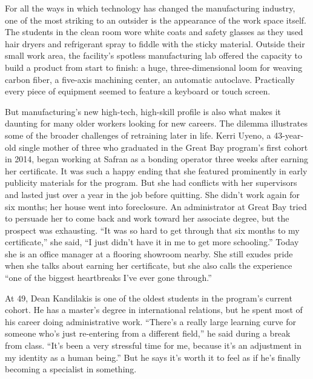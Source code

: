 For all the ways in which technology has changed the manufacturing
industry, one of the most striking to an outsider is the appearance of
the work space itself. The students in the clean room wore white coats
and safety glasses as they used hair dryers and refrigerant spray to
fiddle with the sticky material. Outside their small work area, the
facility's spotless manufacturing lab offered the capacity to build a
product from start to finish: a huge, three-dimensional loom for weaving
carbon fiber, a five-axis machining center, an automatic autoclave.
Practically every piece of equipment seemed to feature a keyboard or
touch screen.

But manufacturing's new high-tech, high-skill profile is also what makes
it daunting for many older workers looking for new careers. The dilemma
illustrates some of the broader challenges of retraining later in life.
Kerri Uyeno, a 43-year-old single mother of three who graduated in the
Great Bay program's first cohort in 2014, began working at Safran as a
bonding operator three weeks after earning her certificate. It was such
a happy ending that she featured prominently in early publicity
materials for the program. But she had conflicts with her supervisors
and lasted just over a year in the job before quitting. She didn't work
again for six months; her house went into foreclosure. An administrator
at Great Bay tried to persuade her to come back and work toward her
associate degree, but the prospect was exhausting. ``It was so hard to
get through that six months to my certificate,'' she said, ``I just
didn't have it in me to get more schooling.'' Today she is an office
manager at a flooring showroom nearby. She still exudes pride when she
talks about earning her certificate, but she also calls the experience
``one of the biggest heartbreaks I've ever gone through.''

At 49, Dean Kandilakis is one of the oldest students in the program's
current cohort. He has a master's degree in international relations, but
he spent most of his career doing administrative work. ``There's a
really large learning curve for someone who's just re-entering from a
different field,'' he said during a break from class. ``It's been a very
stressful time for me, because it's an adjustment in my identity as a
human being.'' But he says it's worth it to feel as if he's finally
becoming a specialist in something.

